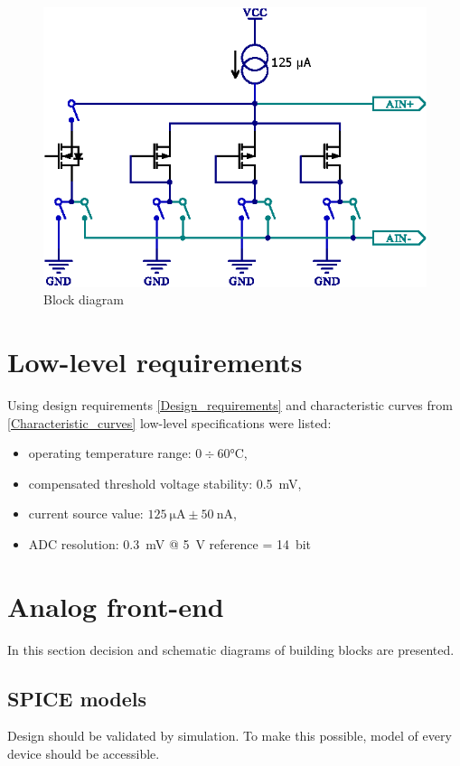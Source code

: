     \begin{figure}[H]
        \centering
        \includegraphics[width=0.7\paperwidth]{img/06/CD4007_mux_schematic.eps}
        \caption{Block diagram}
        \label{sensor_block_diagram}
    \end{figure}

\section{Low-level requirements}
    Using design requirements \ref{Design_requirements} and characteristic curves from \ref{Characteristic_curves} low-level specifications were listed:
    \begin{itemize}
        \item operating temperature range: $0 \div 60 \si{\degreeCelsius}$,
        \item compensated threshold voltage stability: \SI{0.5}{\milli\volt},
        \item current source value: $\SI{125}{\micro\ampere} \pm \SI{50}{\nano\ampere}$,
        \item ADC resolution: \SI{0.3}{\milli\volt} @ \SI{5}{\volt} reference = \SI{14}{bit}
    \end{itemize}


\section{Analog front-end}
    In this section decision and schematic diagrams of building blocks are presented.

    \subsection{SPICE models}
        Design should be validated by simulation. To make this possible, model of every device should be accessible.

